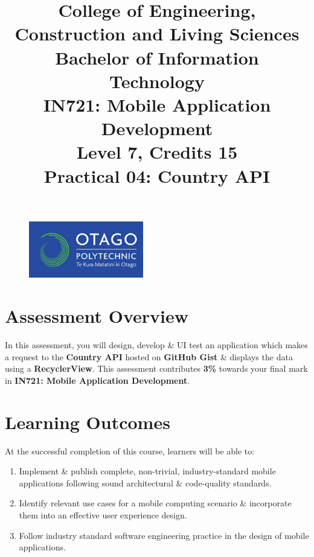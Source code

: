\documentclass{article}
\author{}
\begin{document}
\begin{figure}
    \centering
    \includegraphics[width=50mm]{./img/logo.png}
\end{figure}

\title{College of Engineering, Construction and Living Sciences\\Bachelor of Information Technology\\IN721: Mobile Application Development\\Level 7, Credits 15\\\textbf{Practical 04: Country API}}
\date{}
\maketitle

\section*{Assessment Overview}
In this assessment, you will design, develop \& UI test an application which makes a request to the \textbf{Country API} hosted on \textbf{GitHub Gist} \& displays the data using a \textbf{RecyclerView}. This assessment contributes \textbf{3\%} towards your final mark in \textbf{IN721: Mobile Application Development}.

\section*{Learning Outcomes}
At the successful completion of this course, learners will be able to: 
\begin{enumerate}
	\item Implement \& publish complete, non-trivial, industry-standard mobile applications following sound architectural \& code-quality standards.
	\item Identify relevant use cases for a mobile computing scenario \& incorporate them into an effective user experience design.
	\item Follow industry standard software engineering practice in the design of mobile applications.
\end{enumerate} 
\end{document}
